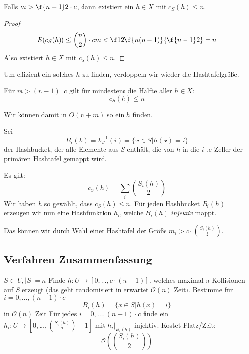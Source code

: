 \documentclass[11pt]{scrbook}
\renewcommand{\O}{\mathcal{O}}
\begin{document}
\begin{kor}
	Falls $m>\f {n-1}2\cdot c$, dann existiert ein $h\in X$ mit $c_S(h)\le n$.
	\begin{proof}
		\[
			E(c_S(h)) \le \binom n2 \cdot cm < \f 12 \f {n(n-1)}{\f{n-1}2} = n
		\]
		Also existiert $h\in X$ mit $c_S(h)\le n$.
	\end{proof}
\end{kor}

Um effizient ein solches $h$ zu finden, verdoppeln  wir wieder die Hashtafelgröße.

\begin{kor}
	Für $m> (n-1)\cdot c$ gilt für mindestens die Hälfte aller $h\in X$:
	\[
		c_S(h) \le n
	\]
	\begin{note}
		Wir können damit in $O(n+m)$ so ein $h$ finden.
	\end{note}
\end{kor}

\begin{df}
	Sei 
	\[
		B_i(h) = h_S^{-1} (i) = \{x\in S\big| h(x)=i\}
	\]
	der Hashbucket, der alle Elemente aus $S$ enthält, die von $h$ in die $i$-te Zeller der primären Hashtafel gemappt wird.
\end{df}

Es gilt: 
\[
	c_S(h) = \sum_{i}\binom{S_i(h)}2
\]
Wir haben $h$ so gewählt, dass $c_S(h) \le n$.
Für jeden Hashbucket $B_i(h)$ erzeugen wir nun eine Hashfunktion $h_i$, welche $B_i(h)$ \emph{injektiv} mappt.

Das können wir durch Wahl einer Hashtafel der Größe $m_i > c\cdot \binom {S_i(h)}2$.


\subsection{Verfahren Zusammenfassung}

\begin{alg}
	\begin{algorithmic}
		\Require $S\subset U, |S| = n$
		\Statex
		\State Finde $h:U\to[0,\dotsc,c\cdot(n-1)]$, welches maximal $n$ Kollisionen auf $S$ erzeugt (das geht randomisiert in erwartet $\O(n)$ Zeit).
		\State Bestimme für $i=0,\dotsc, (n-1)\cdot c$
		\[
			B_i(h) = \{x\in S\big| h(x) = i\}
		\]
		in $\O(n)$ Zeit
		\State Für jedes $i=0,\dotsc, (n-1)\cdot c$ finde ein $h_i:U\to [0,\dotsc, \binom {S_i(h)}2 - 1]$ mit $h_i\big|_{B_i(h)}$ injektiv.
		Kostet Platz/Zeit:
		\[
			\O(\binom {S_i(h)}2)
		\]
	\end{algorithmic}
\end{alg}
\end{document}
